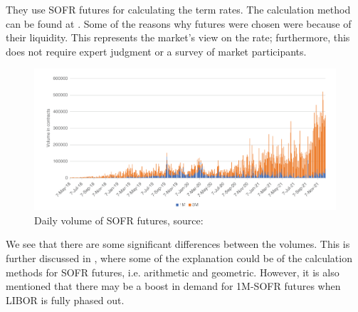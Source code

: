 \newpage 

They use SOFR futures for calculating the term rates. The calculation method can be found at \cite{CMEGroup}. Some of the reasons why futures were chosen were because of their liquidity. This represents the market's view on the rate; furthermore, this does not require expert judgment or a survey of market participants.  

\begin{figure}[htp]
    \centering
    \includegraphics[width=14cm]{figures/SOFR/SOFR_future_volume.PNG}
    \caption{Daily volume of SOFR futures, source: \cite{huggins2022sofr} }
    \label{fig: Volume_SOFR_futures}
\end{figure}

We see that there are some significant differences between the volumes. This is further discussed in \cite{huggins2022sofr}, where some of the explanation could be of the calculation methods for SOFR futures, i.e. arithmetic and geometric. However, it is also mentioned that there may be a boost in demand for 1M-SOFR futures when LIBOR is fully phased out. 









